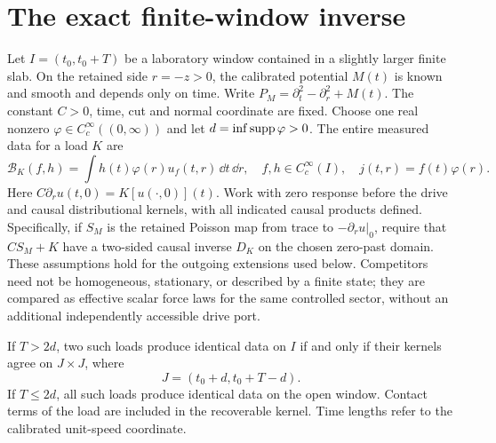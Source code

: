 \section{The exact finite-window inverse}
\label{sec:recover}

Let \(I=(t_0,t_0+T)\) be a laboratory window contained in a slightly larger finite slab. On the retained side \(r=-z>0\), the calibrated potential \(M(t)\) is known and smooth and depends only on time. Write \(P_M=\partial_t^2-\partial_r^2+M(t)\). The constant \(C>0\), time, cut and normal coordinate are fixed. Choose one real nonzero \(\varphi\in C_c^\infty((0,\infty))\) and let \(d=\inf\operatorname{supp}\varphi>0\). The entire measured data for a load \(K\) are
\[
  \mathcal B_K(f,h)=\int h(t)\varphi(r)u_f(t,r)\,\dd t\,\dd r,
  \quad f,h\in C_c^\infty(I),\quad j(t,r)=f(t)\varphi(r).
\]
Here \(C\partial_r u(t,0)=K[u(\cdot,0)](t)\). Work with zero response before the drive and causal distributional kernels, with all indicated causal products defined. Specifically, if \(S_M\) is the retained Poisson map from trace to \(-\partial_r u|_0\), require that \(CS_M+K\) have a two-sided causal inverse \(D_K\) on the chosen zero-past domain. These assumptions hold for the outgoing extensions used below. Competitors need not be homogeneous, stationary, or described by a finite state; they are compared as effective scalar force laws for the same controlled sector, without an additional independently accessible drive port.

\begin{theorem}\label{thm:recover}
If \(T>2d\), two such loads produce identical data on \(I\) if and only if their kernels agree on \(J\times J\), where
\[
                     J=(t_0+d,t_0+T-d).
\]
If \(T\le2d\), all such loads produce identical data on the open window. Contact terms of the load are included in the recoverable kernel. Time lengths refer to the calibrated unit-speed coordinate.
\end{theorem}

